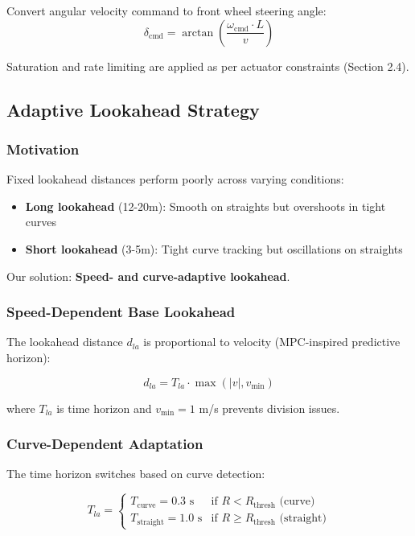 \documentclass[12pt]{article}
\begin{document}
Convert angular velocity command to front wheel steering angle:
\begin{equation}
\delta_{\text{cmd}} = \arctan\left(\frac{\omega_{\text{cmd}} \cdot L}{v}\right)
\end{equation}

Saturation and rate limiting are applied as per actuator constraints (Section 2.4).

\subsection{Adaptive Lookahead Strategy}

\subsubsection{Motivation}

Fixed lookahead distances perform poorly across varying conditions:
\begin{itemize}
    \item \textbf{Long lookahead} (12-20m): Smooth on straights but overshoots in tight curves
    \item \textbf{Short lookahead} (3-5m): Tight curve tracking but oscillations on straights
\end{itemize}

Our solution: \textbf{Speed- and curve-adaptive lookahead}.

\subsubsection{Speed-Dependent Base Lookahead}

The lookahead distance $d_{la}$ is proportional to velocity (MPC-inspired predictive horizon):

\begin{equation}
d_{la} = T_{la} \cdot \max(|v|, v_{\min})
\end{equation}

where $T_{la}$ is time horizon and $v_{\min} = 1$ m/s prevents division issues.

\subsubsection{Curve-Dependent Adaptation}

The time horizon switches based on curve detection:

\begin{equation}
T_{la} = \begin{cases}
T_{\text{curve}} = 0.3 \text{ s} & \text{if } R < R_{\text{thresh}} \text{ (curve)} \\
T_{\text{straight}} = 1.0 \text{ s} & \text{if } R \geq R_{\text{thresh}} \text{ (straight)}
\end{cases}
\end{equation}
\end{document}
